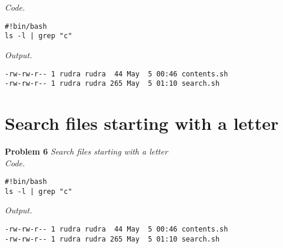 \documentclass[12pt]{article}
\begin{document}
\textit{Code.}

\begin{lstlisting}
#!bin/bash
ls -l | grep "c"
\end{lstlisting}

\textit{Output.}
\begin{lstlisting}
-rw-rw-r-- 1 rudra rudra  44 May  5 00:46 contents.sh
-rw-rw-r-- 1 rudra rudra 265 May  5 01:10 search.sh
\end{lstlisting}

\section{Search files starting with a letter}

\textbf{Problem 6} \textit{Search files starting with a letter}\\

\textit{Code.}

\begin{lstlisting}
#!bin/bash
ls -l | grep "c"
\end{lstlisting}

\textit{Output.}
\begin{lstlisting}
-rw-rw-r-- 1 rudra rudra  44 May  5 00:46 contents.sh
-rw-rw-r-- 1 rudra rudra 265 May  5 01:10 search.sh
\end{lstlisting}
\end{document}
